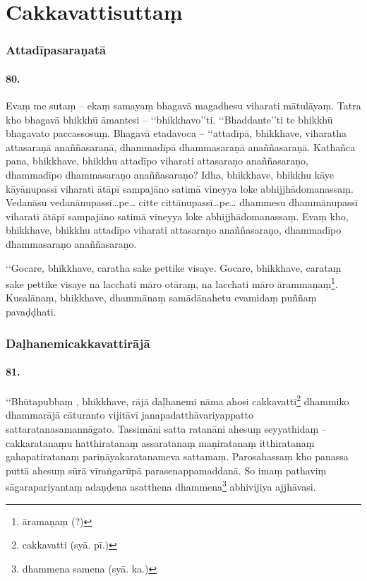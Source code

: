 \section{Cakkavattisuttaṃ}

\subsubsection{Attadīpasaraṇatā}

\paragraph{80.} Evaṃ me sutaṃ – ekaṃ samayaṃ bhagavā magadhesu viharati mātulāyaṃ. Tatra kho bhagavā bhikkhū āmantesi – ‘‘bhikkhavo’’ti. ‘‘Bhaddante’’ti te bhikkhū bhagavato paccassosuṃ. Bhagavā etadavoca – ‘‘attadīpā, bhikkhave, viharatha attasaraṇā anaññasaraṇā, dhammadīpā dhammasaraṇā anaññasaraṇā. Kathañca pana, bhikkhave, bhikkhu attadīpo viharati attasaraṇo anaññasaraṇo, dhammadīpo dhammasaraṇo anaññasaraṇo? Idha, bhikkhave, bhikkhu kāye kāyānupassī viharati ātāpī sampajāno satimā vineyya loke abhijjhādomanassaṃ. Vedanāsu vedanānupassī…pe… citte cittānupassī…pe… dhammesu dhammānupassī viharati ātāpī sampajāno satimā vineyya loke abhijjhādomanassaṃ. Evaṃ kho, bhikkhave, bhikkhu attadīpo viharati attasaraṇo anaññasaraṇo, dhammadīpo dhammasaraṇo anaññasaraṇo.

‘‘Gocare, bhikkhave, caratha sake pettike visaye. Gocare, bhikkhave, carataṃ sake pettike visaye na lacchati māro otāraṃ, na lacchati māro ārammaṇaṃ\footnote{āramaṇaṃ (?)}. Kusalānaṃ, bhikkhave, dhammānaṃ samādānahetu evamidaṃ puññaṃ pavaḍḍhati.

\subsubsection{Daḷhanemicakkavattirājā}

\paragraph{81.} ‘‘Bhūtapubbaṃ , bhikkhave, rājā daḷhanemi nāma ahosi cakkavattī\footnote{cakkavatti (syā. pī.)} dhammiko dhammarājā cāturanto vijitāvī janapadatthāvariyappatto sattaratanasamannāgato. Tassimāni satta ratanāni ahesuṃ seyyathidaṃ – cakkaratanaṃu hatthiratanaṃ assaratanaṃ maṇiratanaṃ itthiratanaṃ gahapatiratanaṃ pariṇāyakaratanameva sattamaṃ. Parosahassaṃ kho panassa puttā ahesuṃ sūrā vīraṅgarūpā parasenappamaddanā. So imaṃ pathaviṃ sāgarapariyantaṃ adaṇḍena asatthena dhammena\footnote{dhammena samena (syā. ka.)} abhivijiya ajjhāvasi.

